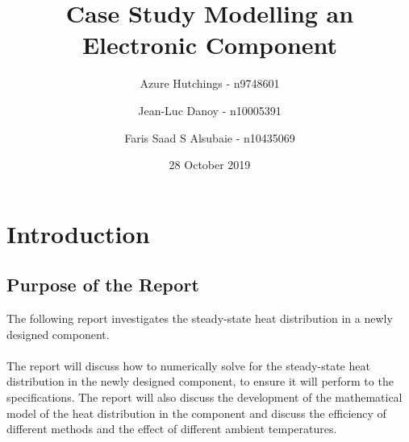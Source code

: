 \documentclass[12pt,a4paper]{article}
\title{Case Study Modelling an Electronic Component}
\author{
  Azure Hutchings - n9748601
  \and
  Jean-Luc Danoy - n10005391
  \and
  Faris Saad S Alsubaie - n10435069
}
\date{28 October 2019}
\begin{document}
 
\begin{titlepage}
\maketitle
\end{titlepage}

\pagebreak

\tableofcontents

\pagebreak

\section{Introduction}

\subsection{Purpose of the Report}
The following report investigates the steady-state heat distribution in a newly designed component. 
\\\\
The report will discuss how to numerically solve for the steady-state heat distribution in the newly designed component, to ensure it will perform to the specifications. The report will also discuss the development of the mathematical model of the heat distribution in the component and discuss the efficiency of different methods and the effect of different ambient temperatures.
\end{document}
